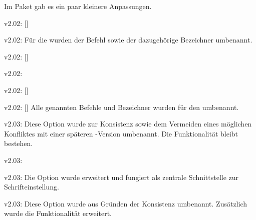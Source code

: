 %
Im Paket  gab es ein paar kleinere Anpassungen.
\begin{Bundle}{}
\begin{Obsolete}{v2.02:}{%
  []%
}
\begin{Obsolete}{v2.02:}{}
\printobsoletelist%
%
Für die \taskname{} wurden der Befehl sowie der dazugehörige Bezeichner 
umbenannt.
\end{Obsolete}
\end{Obsolete}

\begin{Obsolete}{v2.02:}{%
  []%
}
\begin{Obsolete}{v2.02:}{}
\begin{Obsolete}{v2.02:}{%
  []%
}
\begin{Obsolete}{v2.02:}{%
  []%
}
\printobsoletelist%
%
Alle genannten Befehle und Bezeichner wurden für den \noticename{} umbenannt.
\end{Obsolete}
\end{Obsolete}
\end{Obsolete}
\end{Obsolete}
\end{Bundle}


%
\begin{Obsolete}{v2.03:}{}
\printobsoletelist%
%
Diese Option wurde zur Konsistenz sowie dem Vermeiden eines möglichen 
Konfliktes mit einer späteren \KOMAScript-Version umbenannt. Die Funktionalität 
bleibt bestehen.
\end{Obsolete}

\begin{Obsolete}{v2.03:}{}
\begin{Obsolete}{v2.03:}{}
\printobsoletelist%
%
Die Option  wurde erweitert und fungiert als zentrale 
Schnittstelle zur Schrifteinstellung. 
\end{Obsolete}
\end{Obsolete}

\begin{Obsolete}{v2.03:}{}
\printobsoletelist%
%
Diese Option wurde aus Gründen der Konsistenz umbenannt. Zusätzlich wurde die 
Funktionalität erweitert.
\end{Obsolete}

